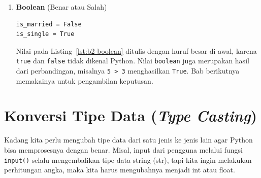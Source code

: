 \begin{enumerate}
\begin{enumerate}
\begin{lstlisting}[style=PythonStyle, caption={Contoh nilai string}, label={lst:b2-string}]
Terima kasih atas pesanan anda.
"""
\end{lstlisting}

Tanda kutip tunggal dan ganda pada Listing~\ref{lst:b2-string} sama artinya, sedangkan kutip tiga dipakai untuk teks beberapa baris. Angka di dalam tanda kutip adalah teks, sehingga perilakunya berbeda dari angka biasa. Listing~\ref{lst:b2-str-num} memperlihatkan ketiga kemungkinannya, dan keluarannya ada pada Listing~\ref{lst:b2-str-num-out}.

\begin{lstlisting}[style=PythonStyle, caption={Kode Python: teks_dan_angka.py}, label={lst:b2-str-num}]
print("10" + "5")
print(10 + 5)
print("10" + 5)
\end{lstlisting}

\begin{lstlisting}[language=bash, caption={Keluaran teks_dan_angka.py}, label={lst:b2-str-num-out}]
105
15
TypeError: can only concatenate str (not "int") to str
\end{lstlisting}

Tanda \texttt{+} pada dua teks berarti menyambung, dan pada dua angka berarti menjumlahkan. Python tidak mau menebak maksud pencampuran keduanya, sehingga baris terakhir menghasilkan \texttt{TypeError}.
\end{enumerate}

\item \textbf{Boolean} (Benar atau Salah)
\begin{lstlisting}[style=PythonStyle, caption={Contoh nilai boolean}, label={lst:b2-boolean}]
is_married = False
is_single = True
\end{lstlisting}

Nilai pada Listing~\ref{lst:b2-boolean} ditulis dengan huruf besar di awal, karena \texttt{true} dan \texttt{false} tidak dikenal Python. Nilai \texttt{boolean} juga merupakan hasil dari perbandingan, misalnya \texttt{5 > 3} menghasilkan \texttt{True}. Bab berikutnya memakainya untuk pengambilan keputusan.
\end{enumerate}

\section{Konversi Tipe Data (\textit{Type Casting})}

Kadang kita perlu mengubah tipe data dari satu jenis ke jenis lain agar Python bisa memprosesnya dengan benar.
Misal, input dari pengguna melalui fungsi \texttt{input()} selalu mengembalikan tipe data string (str), tapi kita ingin melakukan perhitungan angka, maka kita harus mengubahnya menjadi int atau float.


